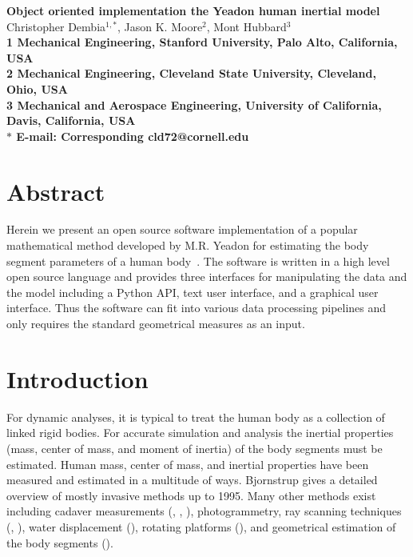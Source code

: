 \documentclass[10pt]{article}
\date{}
\begin{document}
\begin{flushleft}
{\Large
\textbf{Object oriented implementation the Yeadon human inertial model}
}
\\
Christopher Dembia$^{1,\ast}$,
Jason K. Moore$^{2}$,
Mont Hubbard$^{3}$
\\
\bf{1} Mechanical Engineering, Stanford University, Palo Alto, California, USA
\\
\bf{2} Mechanical Engineering, Cleveland State University, Cleveland, Ohio, USA
\\
\bf{3} Mechanical and Aerospace Engineering, University of California, Davis, California, USA
\\
$\ast$ E-mail: Corresponding cld72@cornell.edu
\end{flushleft}

\section*{Abstract}
Herein we present an open source software implementation of a popular
mathematical method developed by M.R. Yeadon for estimating the body segment
parameters of a human body~\cite{Yeadon1990f}. The software is written in a
high level open source language and provides three interfaces for manipulating
the data and the model including a Python API, text user interface, and a
graphical user interface. Thus the software can fit into various data
processing pipelines and only requires the standard geometrical measures as an
input.

\section*{Introduction}
For dynamic analyses, it is typical to treat the human body as a collection of
linked rigid bodies. For accurate simulation and analysis the inertial
properties (mass, center of mass, and moment of inertia) of the body segments
must be estimated. Human mass, center of mass, and inertial properties have
been measured and estimated in a multitude of ways. Bjornstrup
\cite{Bjornstrup1995} gives a detailed overview of mostly invasive methods up
to 1995. Many other methods exist including cadaver measurements
(\cite{Dempster1955}, \cite{Clauser1969}, \cite{Chandler1975}), photogrammetry,
ray scanning techniques (\cite{Zatsiorsky1983}, \cite{Zatsiorsky1990}), water
displacement (\cite{Park1999}), rotating platforms (\cite{Griffiths2005}), and
geometrical estimation of the body segments (\cite{Yeadon1990c}).
\end{document}
